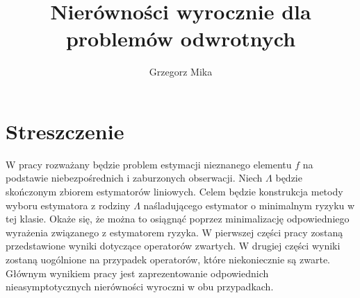 \documentclass{mwart}
\title{Nierówności wyrocznie dla problemów odwrotnych}
\author{Grzegorz Mika}
\begin{document}
\maketitle
\section{Streszczenie}
W pracy rozważany będzie problem estymacji nieznanego elementu $f$ na podstawie niebezpośrednich i zaburzonych obserwacji. Niech $\Lambda$ będzie skończonym zbiorem estymatorów liniowych. Celem będzie konstrukcja metody wyboru estymatora z rodziny $\Lambda$ naśladującego estymator o minimalnym ryzyku w tej klasie. Okaże się, że można to osiągnąć poprzez minimalizację odpowiedniego wyrażenia związanego z estymatorem ryzyka. W pierwszej części pracy zostaną przedstawione wyniki dotyczące operatorów zwartych. W drugiej części wyniki zostaną uogólnione na przypadek operatorów, które niekoniecznie są zwarte. Głównym wynikiem pracy jest zaprezentowanie odpowiednich nieasymptotycznych nierówności wyroczni w obu przypadkach.
\tableofcontents
\end{document}
